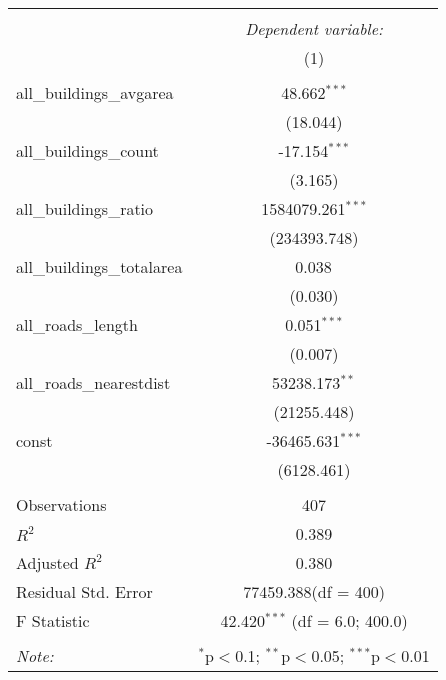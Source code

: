 \begin{table}[!htbp] \centering
\begin{tabular}{@{\extracolsep{5pt}}lc}
\\[-1.8ex]\hline
\hline \\[-1.8ex]
& \multicolumn{1}{c}{\textit{Dependent variable:}} \
\cr \cline{1-2}
\\[-1.8ex] & (1) \\
\hline \\[-1.8ex]
 all_buildings_avgarea & 48.662$^{***}$ \\
  & (18.044) \\
 all_buildings_count & -17.154$^{***}$ \\
  & (3.165) \\
 all_buildings_ratio & 1584079.261$^{***}$ \\
  & (234393.748) \\
 all_buildings_totalarea & 0.038$^{}$ \\
  & (0.030) \\
 all_roads_length & 0.051$^{***}$ \\
  & (0.007) \\
 all_roads_nearestdist & 53238.173$^{**}$ \\
  & (21255.448) \\
 const & -36465.631$^{***}$ \\
  & (6128.461) \\
\hline \\[-1.8ex]
 Observations & 407 \\
 $R^2$ & 0.389 \\
 Adjusted $R^2$ & 0.380 \\
 Residual Std. Error & 77459.388(df = 400)  \\
 F Statistic & 42.420$^{***}$ (df = 6.0; 400.0) \\
\hline
\hline \\[-1.8ex]
\textit{Note:} & \multicolumn{1}{r}{$^{*}$p$<$0.1; $^{**}$p$<$0.05; $^{***}$p$<$0.01} \\
\end{tabular}
\end{table}